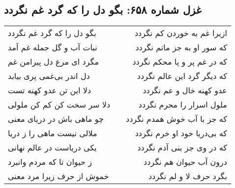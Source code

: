 \begin{center}
\section*{غزل شماره ۶۵۸: بگو دل را که گرد غم نگردد}
\label{sec:0658}
\begin{longtable}{l p{0.5cm} r}
بگو دل را که گرد غم نگردد
&&
ازیرا غم به خوردن کم نگردد
\\
نبات آب و گل جمله غم آمد
&&
که سور او به جز ماتم نگردد
\\
مگرد ای مرغ دل پیرامن غم
&&
که در غم پر و پا محکم نگردد
\\
دل اندر بی‌غمی پری بیابد
&&
که دیگر گرد این عالم نگردد
\\
دلا این تن عدو کهنه تست
&&
عدو کهنه خال و عم نگردد
\\
دلا سر سخت کن کم کن ملولی
&&
ملول اسرار را محرم نگردد
\\
چو ماهی باش در دریای معنی
&&
که جز با آب خوش همدم نگردد
\\
ملالی نیست ماهی را ز دریا
&&
که بی‌دریا خود او خرم نگردد
\\
یکی دریاست در عالم نهانی
&&
که در وی جز بنی آدم نگردد
\\
ز حیوان تا که مردم وانبرد
&&
درون آب حیوان هم نگردد
\\
خموش از حرف زیرا مرد معنی
&&
بگرد حرف لا و لم نگردد
\\
\end{longtable}
\end{center}
